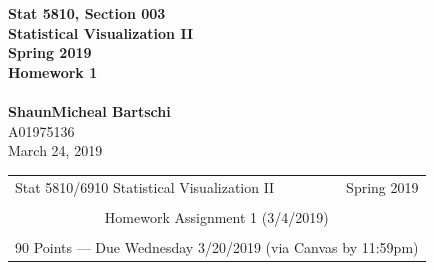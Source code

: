 \documentclass[12pt,letterpaper,final]{article}
\begin{document}


\begin{titlepage}
\vspace*{4.5cm}
\begin{center}
{\LARGE \bf Stat 5810, Section 003} \\[0.5cm]
{\LARGE \bf Statistical Visualization II} \\[0.5cm]
{\LARGE \bf Spring 2019} \\[0.5cm]
{\LARGE \bf Homework 1} \\[0.5cm]
~ \\[2cm]
{\bf ShaunMicheal Bartschi} \\[0.3cm]
{A01975136} \\[0.3cm]
{March 24, 2019} \\[0.3cm]
\end{center}

\thispagestyle{empty}
\vfill
\end{titlepage}

\begin{table}\centering
\begin{tabular*}{6.15in}{@{\extracolsep{\fill}}|llr|} \hline
Stat 5810/6910 Statistical Visualization II  & \hspace*{0.5 in} & Spring 2019 \\
 & & \\
\multicolumn{3}{|c|}{
Homework Assignment 1 (3/4/2019)} \\
 & & \\
\multicolumn{3}{|c|}{
90 Points --- Due Wednesday 3/20/2019 (via Canvas by 11:59pm)} \\
\hline
\end{tabular*}
\end{table}
\end{document}
